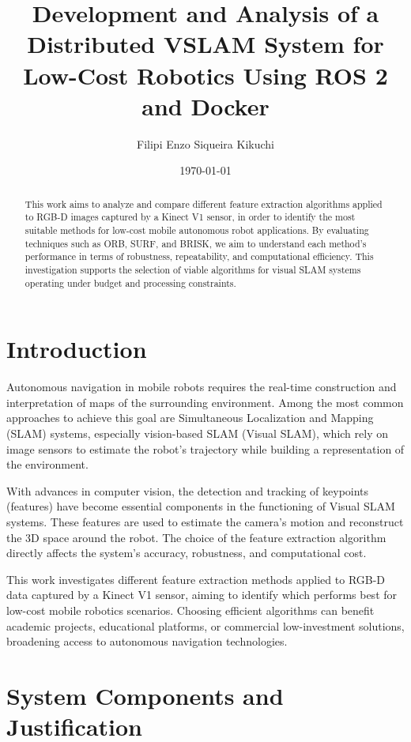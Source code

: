 \documentclass[a4paper,12pt]{article}
\title{Development and Analysis of a Distributed VSLAM System for Low-Cost Robotics Using ROS 2 and Docker}
\author{Filipi Enzo Siqueira Kikuchi}
\date{\today}
\begin{document}
\maketitle

\begin{abstract}
This work aims to analyze and compare different feature extraction algorithms applied to RGB-D images captured by a Kinect V1 sensor, in order to identify the most suitable methods for low-cost mobile autonomous robot applications. By evaluating techniques such as ORB, SURF, and BRISK, we aim to understand each method’s performance in terms of robustness, repeatability, and computational efficiency. This investigation supports the selection of viable algorithms for visual SLAM systems operating under budget and processing constraints.
\end{abstract}

\section{Introduction}

Autonomous navigation in mobile robots requires the real-time construction and interpretation of maps of the surrounding environment. Among the most common approaches to achieve this goal are Simultaneous Localization and Mapping (SLAM) systems, especially vision-based SLAM (Visual SLAM), which rely on image sensors to estimate the robot’s trajectory while building a representation of the environment.

With advances in computer vision, the detection and tracking of keypoints (features) have become essential components in the functioning of Visual SLAM systems. These features are used to estimate the camera’s motion and reconstruct the 3D space around the robot. The choice of the feature extraction algorithm directly affects the system’s accuracy, robustness, and computational cost.

This work investigates different feature extraction methods applied to RGB-D data captured by a Kinect V1 sensor, aiming to identify which performs best for low-cost mobile robotics scenarios. Choosing efficient algorithms can benefit academic projects, educational platforms, or commercial low-investment solutions, broadening access to autonomous navigation technologies.

\section{System Components and Justification}
\end{document}
